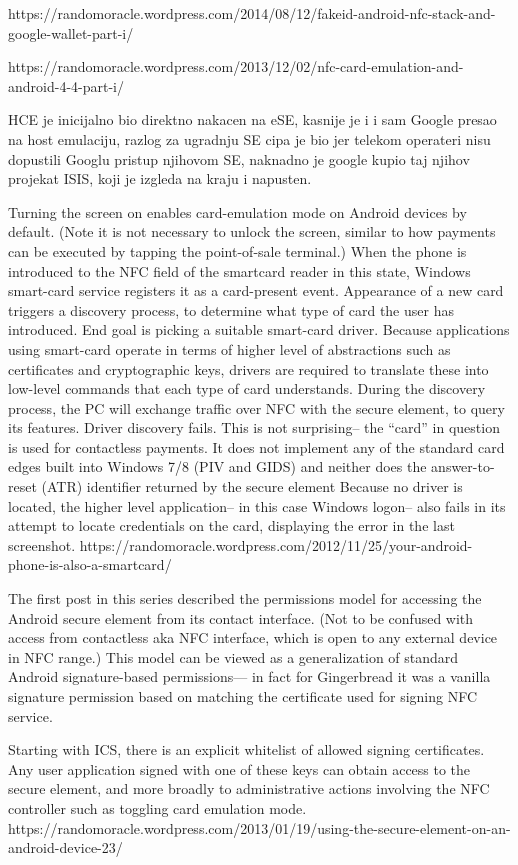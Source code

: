 https://randomoracle.wordpress.com/2014/08/12/fakeid-android-nfc-stack-and-google-wallet-part-i/

https://randomoracle.wordpress.com/2013/12/02/nfc-card-emulation-and-android-4-4-part-i/

HCE je inicijalno bio direktno nakacen na eSE, kasnije je i i sam Google presao na host emulaciju, razlog za ugradnju SE cipa je bio jer telekom operateri nisu dopustili Googlu pristup njihovom SE, naknadno je google kupio taj njihov projekat ISIS, koji je izgleda na kraju i napusten.

Turning the screen on enables card-emulation mode on Android devices by default. (Note it is not necessary to unlock the screen, similar to how payments can be executed by tapping the point-of-sale terminal.)
When the phone is introduced to the NFC field of the smartcard reader in this state, Windows smart-card service registers it as a card-present event.
Appearance of a new card triggers a discovery process, to determine what type of card the user has introduced. End goal is picking a suitable smart-card driver. Because applications using smart-card operate in terms of higher level of abstractions such as certificates and cryptographic keys, drivers are required to translate these into low-level commands that each type of card understands.
During the discovery process, the PC will exchange traffic over NFC with the secure element, to query its features.
Driver discovery fails. This is not surprising– the “card” in question is used for contactless payments. It does not implement any of the standard card edges built into Windows 7/8 (PIV and GIDS) and neither does the answer-to-reset (ATR) identifier returned by the secure element
Because no driver is located, the higher level application– in this case Windows logon– also fails in its attempt to locate credentials on the card, displaying the error in the last screenshot.
https://randomoracle.wordpress.com/2012/11/25/your-android-phone-is-also-a-smartcard/

The first post in this series described the permissions model for accessing the Android secure element from its contact interface. (Not to be confused with access from contactless aka NFC interface, which is open to any external device in NFC range.) This model can be viewed as a generalization of standard Android signature-based permissions— in fact for Gingerbread it was a vanilla signature permission based on matching the certificate used for signing NFC service.

Starting with ICS, there is an explicit whitelist of allowed signing certificates. Any user application signed with one of these keys can obtain access to the secure element, and more broadly to administrative actions involving the NFC controller such as toggling card emulation mode.
https://randomoracle.wordpress.com/2013/01/19/using-the-secure-element-on-an-android-device-23/
